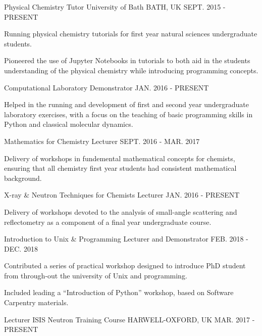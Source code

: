 \begin{cventries}
	\cventry
	{Physical Chemistry Tutor}
	{University of Bath}
	{BATH, UK}
	{SEPT. 2015 - PRESENT}
	{
		\begin{cvitems}
			\item {Running physical chemistry tutorials for first year natural sciences undergraduate students.}
			\item {Pioneered the use of Jupyter Notebooks in tutorials to both aid in the students understanding of the physical chemistry while introducing programming concepts.}
		\end{cvitems}
	}
	\cventry
	{Computational Laboratory Demonstrator}
	{}
	{}
	{JAN. 2016 - PRESENT}
	{
		\begin{cvitems}
			\item {Helped in the running and development of first and second year undergraduate laboratory exercises, with a focus on the teaching of basic programming skills in Python and classical molecular dynamics.}
		\end{cvitems}
	}
	\cventry
	{Mathematics for Chemistry Lecturer}
	{}
	{}
	{SEPT. 2016 - MAR. 2017}
	{
		\begin{cvitems}
			\item {Delivery of workshops in fundemental mathematical concepts for chemists, ensuring that all chemistry first year students had consistent mathematical background.}
		\end{cvitems}
	}
	\cventry
	{X-ray \& Neutron Techniques for Chemists Lecturer}
	{}
	{}
	{JAN. 2016 - PRESENT}
	{
		\begin{cvitems}
			\item {Delivery of workshops devoted to the analysis of small-angle scattering and reflectometry as a component of a final year undergraduate course.}
		\end{cvitems}
	}
	\cventry
	{Introduction to Unix \& Programming Lecturer and Demonstrator}
	{}
	{}
	{FEB. 2018 - DEC. 2018}
	{
		\begin{cvitems}
			\item {Contributed a series of practical workshop designed to introduce PhD student from through-out the university of Unix and programming.}
			\item {Included leading a ``Introduction of Python'' workshop, based on Software Carpentry materials. }
		\end{cvitems}
	}
	\cventry
	{Lecturer}
	{ISIS Neutron Training Course}
	{HARWELL-OXFORD, UK}
	{MAR. 2017 - PRESENT}
	{
		\begin{cvitems}

\end{cvitems}}
\end{cventries}

